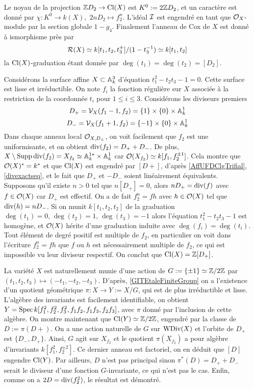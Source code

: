 \begin{ex}
Le noyau de la projection $\mathbb{Z} D_2\rightarrow \operatorname{Cl}(X)$ est $K^0:=2\mathbb{Z} D_2$, et un caractère est donné par $\chi: K^0\rightarrow k(X),\,\,2nD_2\mapsto f_2^n$. L'idéal $\mathcal{I}$ est engendré en tant que $\mathcal{O}_X$-module par la section globale $1-g_4$. Finalement l'anneau de Cox de $X$ est donné à ismorphisme près par
$$\mathcal{R}(X)\simeq k[t_1,t_2,t_3^{\pm}]/(1-t_3^{-1})\simeq k[t_1,t_2]$$
la $\operatorname{Cl}(X)$-graduation étant donnée par $\deg(t_1)=\deg(t_2)=[D_2]$.
\end{ex}

\begin{ex}\label{CoxRingEx3}
Considérons la surface affine $X\subset \mathbb{A}_k^3$ d'équation $t_1^2-t_2t_3-1=0$. Cette surface est lisse et irréductible. On note $f_i$ la fonction régulière sur $X$ associée à la restriction de la coordonnée $t_i$ pour $1\leq i\leq 3$. Considérons les diviseurs premiers
$$D_+=\mathcal{V}_X(f_1-1,f_2)=\lbrace 1\rbrace\times\lbrace 0\rbrace\times \mathbb{A}^1_k$$
$$D_-=\mathcal{V}_X(f_1+1,f_2)=\lbrace -1\rbrace\times\lbrace 0\rbrace\times \mathbb{A}^1_k$$
Dans chaque anneau local $\mathcal{O}_{X,D_\pm}$, on voit facilement que $f_2$ est une uniformisante, et on obtient $\operatorname{div}(f_2)=D_++D_-$. De plus, $X\setminus\operatorname{Supp} \operatorname{div}(f_2)=X_{f_2}\simeq \mathbb{A}^{1*}_k\times \mathbb{A}^1_k$ car $\mathcal{O}(X_{f_2})\simeq k[f_1,f_2^{\pm 1}]$. Cela montre que $\mathcal{O}(X)^*=k^*$ et que $\operatorname{Cl}(X)$ est engendré par $[D+]$, d'après \ref{AffUFDClgTrifial}, \ref{divexactseq}, et le fait que $D_+$ et $-D_-$ soient linéairement équivalents. Supposons qu'il existe $n>0$ tel que $n[D_+]=0$, alors $nD_+=\operatorname{div}(f)$ avec $f\in\mathcal{O}(X)$ car $D_+$ est effectif. On a de fait $f_2^n=fh$ avec $h\in\mathcal{O}(X)$ tel que $\operatorname{div}(h)=nD_-$. Si on munit $k[t_1,t_2,t_2]$ de la graduation $\deg(t_1)=0,\,\deg(t_2)=1,\,\deg(t_3)=-1$ alors l'équation $t_1^2-t_2t_3-1$ est homogène, et $\mathcal{O}(X)$ hérite d'une graduation induite avec $\deg(f_i)=\deg(t_i)$. Tout élément de degré positif est multiple de $f_2$, en particulier on voit dans l'écriture $f_2^n=fh$ que $f$ ou $h$ est nécessairement multiple de $f_2$, ce qui est impossible vu leur diviseur respectif. On conclut que $\operatorname{Cl}(X)=\mathbb{Z}[D_+]$.

La variété $X$ est naturellement munie d'une action de $G:=\lbrace \pm 1\rbrace\simeq \mathbb{Z}/2\mathbb{Z}$ par $(t_1,t_2,t_3)\mapsto (-t_1,-t_2,-t_3)$. D'après, \ref{GITEtaleFiniteGroup} on a l'existence d'un quotient géométrique $\pi:X\rightarrow Y:=X/G$, qui est de plus irréductible et lisse. L'algèbre des invariants est facilement identifiable, on obtient  $Y=\operatorname{Spec} k[f_1^2,f_2^2,f_3^2,f_1f_2,f_1f_3,f_2f_3]$, avec $\pi$ donné par l'inclusion de cette algèbre. On montre maintenant que $\operatorname{Cl}(Y)\simeq \mathbb{Z}/2\mathbb{Z}$, engendré par la classe de $D:=\pi(D+)$. On a une action naturelle de $G$ sur $\operatorname{WDiv}(X)$ et l'orbite de $D_+$ est $\lbrace D_-,D_+\rbrace$. Ainsi, $G$ agit sur $X_{f_2}$ et le quotient $\pi(X_{f_2})$ a pour algèbre d'invariants $k[f_1^2,f_2^{\pm 2}]$. Ce dernier anneau est factoriel, on en déduit que $[D]$ engendre $\operatorname{Cl}(Y)$. Par ailleurs, $D$ n'est pas principal sinon $\pi^*(D)=D_++D_-$ serait le diviseur d'une fonction $G$-invariante, ce qui n'est pas le cas. Enfin, comme on a $2D=\operatorname{div}(f_2^2)$, le résultat est démontré.


\end{ex}
